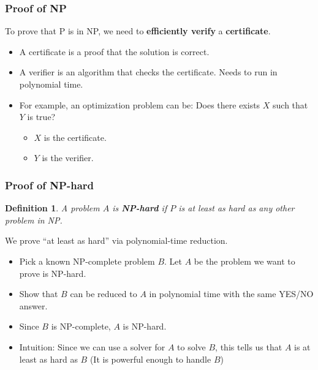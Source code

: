\documentclass[conference]{IEEEtran}
\newtheorem*{definition}{Definition}
\begin{document}
\subsubsection{Proof of NP}
To prove that P is in NP, we need to \textbf{efficiently verify} a \textbf{certificate}.\begin{itemize}
    \item A certificate is a proof that the solution is correct.
    \item A verifier is an algorithm that checks the certificate. Needs to run in polynomial time.
    \item For example, an optimization problem can be: Does there exists $X$ such that $Y$ is true?\begin{itemize}
        \item $X$ is the certificate.
        \item $Y$ is the verifier.
    \end{itemize}
\end{itemize}
\subsubsection{Proof of NP-hard}
\begin{definition}
    A problem $A$ is \textbf{NP-hard} if $P$ is at least as hard as any other problem in NP.
\end{definition}
We prove ``at least as hard'' via polynomial-time reduction. 
\begin{itemize}
    \item Pick a known NP-complete problem $B$. Let $A$ be the problem we want to prove is NP-hard.
    \item Show that $B$ can be reduced to $A$ in polynomial time with the same YES/NO answer.
    \item Since $B$ is NP-complete, $A$ is NP-hard.
    \item Intuition: Since we can use a solver for $A$ to solve $B$, this tells us that $A$ is at least as hard as $B$ (It is powerful enough to handle $B$)
\end{itemize}


\end{document}
